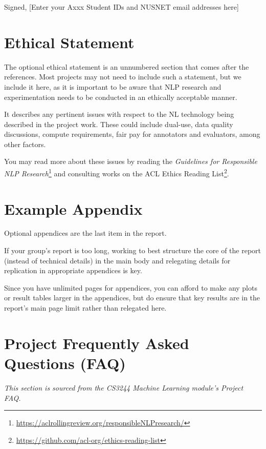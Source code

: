 \documentclass[11pt]{article}
\begin{document}
\noindent Signed, [Enter your Axxx Student IDs and NUSNET email addresses here]

\section*{Ethical Statement}

The optional ethical statement is an unnumbered section that comes after the references.  Most projects may not need to include such a statement, but we include it here, as it is important to be aware that NLP research and experimentation needs to be conducted in an ethically acceptable manner.  

It describes any pertinent issues with respect to the NL technology being described in the project work.  These could include dual-use, data quality discussions, compute requirements, fair pay for annotators and evaluators, among other factors.  

You may read more about these issues by reading the {\it Guidelines for Responsible NLP Research}\footnote{\url{https://aclrollingreview.org/responsibleNLPresearch/}} 
and consulting works on the ACL Ethics Reading List\footnote{\url{https://github.com/acl-org/ethics-reading-list}}.

\appendix

\section{Example Appendix}
\label{sec:appendix}

Optional appendices are the last item in the report.

If your group's report is too long, working to best structure the core of the report (instead of technical details) in the main body and relegating details for replication in appropriate appendices is key.  

Since you have unlimited pages for appendices, you can afford to make any plots or result tables larger in the appendices, but do ensure that key results are in the report's main page limit rather than relegated here.

\section{Project Frequently Asked Questions (FAQ)}

{\it This section is sourced from the CS3244 Machine Learning module's Project FAQ.}

\small
\end{document}
